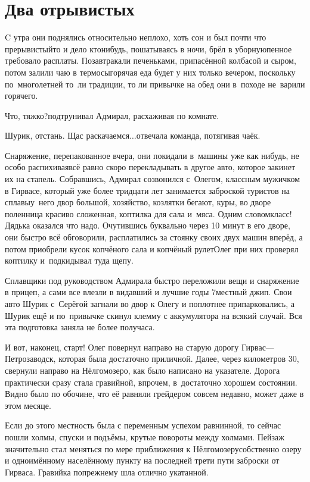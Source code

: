 \chapter{Два отрывистых}
\vepsianrose

C утра они поднялись относительно неплохо, хоть сон и был почти что прерывистый\mdash то и дело кто\sdash нибудь, пошатываясь в ночи, брёл в уборную\mdash пенное требовало расплаты. Позавтракали печеньками, припасённой колбасой и сыром, потом залили чаю в термосы\mdash горячая еда будет у них только вечером, поскольку по~многолетней то~ли традиции, то ли привычке на обед они в~походе не~варили горячего.

\diagdash Что, тяжко?\mdash подтрунивал Адмирал, расхаживая по комнате.

\diagdash Шурик, отстань. Щас раскачаемся$\ldots$\mdash отвечала команда, потягивая чаёк.

Снаряжение, перепакованное вчера, они покидали в~машины уже как нибудь, не особо распихивая\mdash всё равно скоро перекладывать в другое авто, которое закинет их на стапель. Собравшись, Адмирал созвонился с~Олегом, классным мужичком в Гирвасе, который уже более тридцати лет занимается заброской туристов на сплавы\mdash у~него двор большой, хозяйство, козлятки бегают, куры, во дворе поленница красиво сложенная, коптилка для сала и~мяса. Одним словом\mdash класс! Дядька оказался что надо. Очутившись буквально через 10 минут в его дворе, они быстро всё обговорили, расплатились за стоянку своих двух машин вперёд, а потом приобрели кусок копчёного сала и копчёный рулет\mdash Олег при них проверял коптилку и~подкидывал туда щепу.

Сплавщики под руководством Адмирала быстро переложили вещи и снаряжение в прицеп, а сами все влезли в видавший и лучшие годы 7\sdash местный джип. Свои авто Шурик с~Серёгой загнали во двор к Олегу и поплотнее припарковались, а Шурик ещё и по~привычке скинул клемму с аккумулятора на всякий случай. Вся эта подготовка заняла не более получаса.

И вот, наконец, старт! Олег повернул направо на старую дорогу Гирвас\thinspace\nobreakdash---\thinspace  Петрозаводск, которая была достаточно приличной. Далее, через километров 30, свернули направо на Нёлгомозеро, как было написано на указателе. Дорога практически сразу стала гравийной, впрочем, в~достаточно хорошем состоянии. Видно было по обочине, что её равняли грейдером совсем недавно, может даже в этом месяце.

Если до этого местность была с переменным успехом равнинной, то сейчас пошли холмы, спуски и подъёмы, крутые повороты между холмами. Пейзаж значительно стал меняться по мере приближения к Нёлгомозеру\mdash собственно озеру и одноимённому населённому пункту на последней трети пути заброски от Гирваса. Гравийка по\sdash прежнему шла отлично укатанной.

